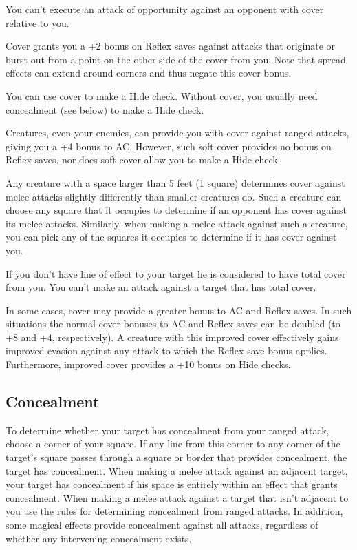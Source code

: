 \vspace*{10pt}

You can't execute an attack of opportunity against an opponent with cover relative to you.

Cover grants you a +2 bonus on Reflex saves against attacks that originate or burst out from a point on the other side of the cover from you. Note that spread effects can extend around corners and thus negate this cover bonus.

You can use cover to make a Hide check. Without cover, you usually need concealment (see below) to make a Hide check.

Creatures, even your enemies, can provide you with cover against ranged attacks, giving you a +4 bonus to AC. However, such soft cover provides no bonus on Reflex saves, nor does soft cover allow you to make a Hide check.

Any creature with a space larger than 5 feet (1 square) determines cover against melee attacks slightly differently than smaller creatures do. Such a creature can choose any square that it occupies to determine if an opponent has cover against its melee attacks. Similarly, when making a melee attack against such a creature, you can pick any of the squares it occupies to determine if it has cover against you.

If you don't have line of effect to your target he is considered to have total cover from you. You can't make an attack against a target that has total cover.

In some cases, cover may provide a greater bonus to AC and Reflex saves. In such situations the normal cover bonuses to AC and Reflex saves can be doubled (to +8 and +4, respectively). A creature with this improved cover effectively gains improved evasion against any attack to which the Reflex save bonus applies. Furthermore, improved cover provides a +10 bonus on Hide checks.

\subsection{Concealment}

To determine whether your target has concealment from your ranged attack, choose a corner of your square. If any line from this corner to any corner of the target's square passes through a square or border that provides concealment, the target has concealment. When making a melee attack against an adjacent target, your target has concealment if his space is entirely within an effect that grants concealment. When making a melee attack against a target that isn't adjacent to you use the rules for determining concealment from ranged attacks. In addition, some magical effects provide concealment against all attacks, regardless of whether any intervening concealment exists.

